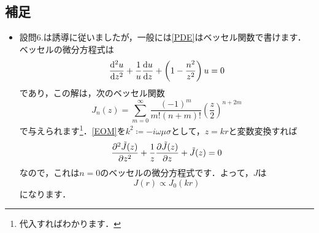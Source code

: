 \documentclass[a4paper,pdflatex,ja=standard]{bxjsarticle}
\begin{document}
\subsection*{補足}

\begin{itemize}
  \item 
  設問6.は誘導に従いましたが，一般には\eqref{PDE}はベッセル関数で書けます．ベッセルの微分方程式は
  \begin{equation}
    \dv[2]{u}{z}
    +
    \frac{1}{u}\dv{u}{z}
    +
    \left( 1-\frac{n^2}{z^2} \right)u
    =
    0
  \end{equation}
  であり，この解は，次のベッセル関数
  \begin{equation}
    J_{n}(z)
    =
    \sum_{m=0}^{\infty}\frac{(-1)^{m}}{m!(n+m)!}\left( \frac{z}{2} \right)^{n+2m}
  \end{equation}
  で与えられます\footnote{
    代入すればわかります．
  }．\eqref{EOM}を$k^2\coloneqq -i\omega\mu\sigma$として，$z=kr$と変数変換すれば
  \begin{equation}
    \pdv[2]{\tilde{J}(z)}{z}
    +
    \frac{1}{z}\pdv{\tilde{J}(z)}{z}
    +
    \tilde{J}(z)
    =
    0
  \end{equation}
  なので，これは$n=0$のベッセルの微分方程式です．よって，$J$は
  \begin{equation}
    J(r)
    \propto
    J_{0}(kr)
  \end{equation}
  になります．

\end{itemize}
\end{document}
